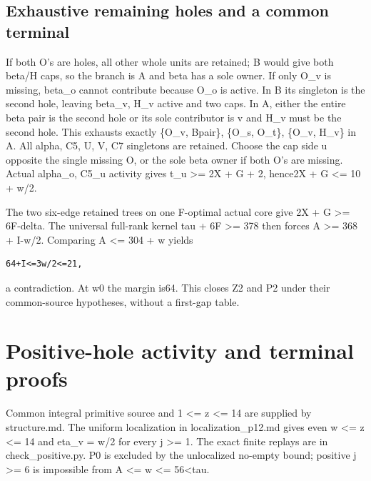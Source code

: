 \documentclass[11pt,a4paper]{article}
\begin{document}
\hypertarget{exhaustive-remaining-holes-and-a-common-terminal}{%
\subsection{Exhaustive remaining holes and a common
terminal}\label{exhaustive-remaining-holes-and-a-common-terminal}}

If both O's are holes, all other whole units are retained; B would give
both beta/H caps, so the branch is A and beta has a sole owner. If only
O\_v is missing, beta\_o cannot contribute because O\_o is active. In B
its singleton is the second hole, leaving beta\_v, H\_v active and two
caps. In A, either the entire beta pair is the second hole or its sole
contributor is v and H\_v must be the second hole. This exhausts exactly
\{O\_v, Bpair\}, \{O\_s, O\_t\}, \{O\_v, H\_v\} in A. All alpha, C5, U,
V, C7 singletons are retained. Choose the cap side u opposite the single
missing O, or the sole beta owner if both O's are missing. Actual
alpha\_o, C5\_u activity gives t\_u \textgreater= 2X + G + 2, hence2X +
G \textless= 10 + w/2.

The two six-edge retained trees on one F-optimal actual core give 2X + G
\textgreater= 6F-delta. The universal full-rank kernel tau + 6F
\textgreater= 378 then forces A \textgreater= 368 + I-w/2. Comparing A
\textless= 304 + w yields

\begin{verbatim}
64+I<=3w/2<=21,
\end{verbatim}

a contradiction. At w0 the margin is64. This closes Z2 and P2 under
their common-source hypotheses, without a first-gap table.

\clearpage
\hypertarget{positive-hole-activity-and-terminal-proofs}{%
\section{Positive-hole activity and terminal
proofs}\label{positive-hole-activity-and-terminal-proofs}}

Common integral primitive source and 1 \textless= z \textless= 14 are
supplied by structure.md. The uniform localization in
localization\_p12.md gives even w \textless= z \textless= 14 and eta\_v
= w/2 for every j \textgreater= 1. The exact finite replays are in
check\_positive.py. P0 is excluded by the unlocalized no-empty bound;
positive j \textgreater= 6 is impossible from A \textless= w \textless=
56\textless tau.
\end{document}
